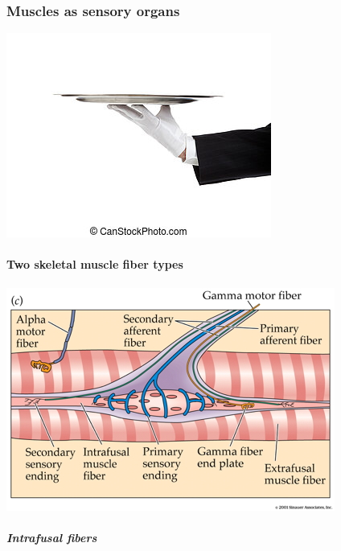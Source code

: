 \documentclass[
  letterpaper,
  DIV=11,
  numbers=noendperiod]{scrartcl}
\let\oldparagraph\paragraph
\renewcommand{\paragraph}[1]{\oldparagraph{#1}\mbox{}}
\let\oldsubparagraph\subparagraph
\renewcommand{\subparagraph}[1]{\oldsubparagraph{#1}\mbox{}}
\begin{document}
\subsubsection{Muscles as sensory
organs}\label{muscles-as-sensory-organs}

\begin{center}
\includegraphics{action_files/mediabag/canstock6466988.jpg}
\end{center}

\paragraph{Two skeletal muscle fiber
types}\label{two-skeletal-muscle-fiber-types}

\begin{center}
\includegraphics{../include/img/muscle-fiber-types.jpg}
\end{center}

\subparagraph{Intrafusal fibers}\label{intrafusal-fibers}
\end{document}
